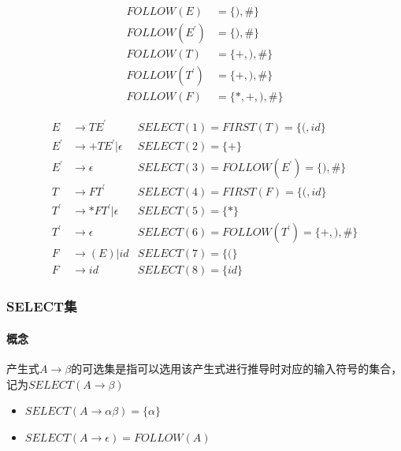 \documentclass[UTF8]{ctexart} %
\begin{document}
\begin{equation}
    \begin{aligned}
        FOLLOW(E)     & = \{),\#\}     \\
        FOLLOW(E^{'}) & = \{),\#\}     \\
        FOLLOW(T)     & = \{+,),\#\}   \\
        FOLLOW(T^{'}) & = \{+,),\#\}   \\
        FOLLOW(F)     & = \{*,+,),\#\}
    \end{aligned}
\end{equation}

\begin{equation}
    \begin{aligned}
        E     & \rightarrow TE^{'}           & SELECT(1)=FIRST(T)=\{(,id\}        \\
        E^{'} & \rightarrow +TE^{'}|\epsilon & SELECT(2)=\{+\}                    \\
        E^{'} & \rightarrow \epsilon         & SELECT(3)=FOLLOW(E^{'})=\{),\#\}   \\
        T     & \rightarrow FT^{'}           & SELECT(4)=FIRST(F)=\{(,id\}        \\
        T^{'} & \rightarrow *FT^{'}|\epsilon & SELECT(5)=\{*\}                    \\
        T^{'} & \rightarrow \epsilon         & SELECT(6)=FOLLOW(T^{'})=\{+,),\#\} \\
        F     & \rightarrow (E)|id           & SELECT(7)=\{(\}                    \\
        F     & \rightarrow id               & SELECT(8)=\{id\}
    \end{aligned}
\end{equation}

\subsubsection{SELECT集}

\paragraph{概念} 产生式$A\rightarrow \beta$的可选集是指可以选用该产生式进行推导时对应的输入符号的集合，记为$SELECT(A\rightarrow \beta)$

\begin{itemize}
    \item $SELECT(A\rightarrow \alpha\beta)=\{\alpha\}$
    \item $SELECT(A\rightarrow \epsilon)=FOLLOW(A)$
\end{itemize}
\end{document}
